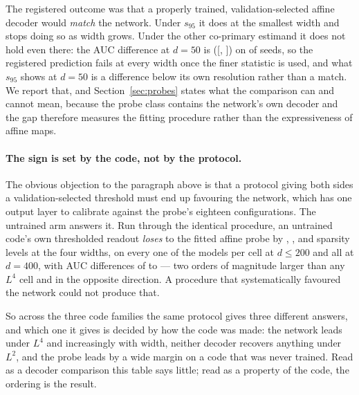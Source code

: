 The registered outcome was that a properly trained, validation-selected affine decoder would
\emph{match} the network. Under $s_{95}$ it does at the smallest width and stops doing so as width
grows. Under the other co-primary estimand it does not hold even there: the AUC difference at $d=50$
is \AucFiftyDiff{} ([\AucFiftyCiLow, \AucFiftyCiHigh]) on \AucFiftyNetWins{} of \EsevenSeeds{} seeds,
so the registered prediction fails at every width once the finer statistic is used, and what $s_{95}$
shows at $d=50$ is a difference below its own resolution rather than a match. We
report that, and Section~\ref{sec:probes} states what the comparison can and cannot mean, because
the probe class contains the network's own decoder and the gap therefore measures the fitting
procedure rather than the expressiveness of affine maps.

\paragraph{The sign is set by the code, not by the protocol.} The obvious objection to the paragraph
above is that a protocol giving both sides a validation-selected threshold must end up favouring the
network, which has one output layer to calibrate against the probe's eighteen configurations. The
untrained arm answers it. Run through the identical procedure, an untrained code's own thresholded
readout \emph{loses} to the fitted affine probe by \PrimRandFiftyDiff{}, \PrimRandHundredDiff{},
\PrimRandTwoHundredDiff{} and \PrimRandFourHundredDiff{} sparsity levels at the four widths, on every
one of the \PrimRandTwoHundredProbeWins{} models per cell at $d\le200$ and all
\PrimRandFourHundredProbeWins{} at $d=400$, with AUC differences of \PrimRandFiftyAucDiff{} to
\PrimRandFourHundredAucDiff{} --- two orders of magnitude larger than any $L^4$ cell and in the
opposite direction. A procedure that systematically favoured the network could not produce that.

So across the three code families the same protocol gives three different answers, and which one it
gives is decided by how the code was made: the network leads under $L^4$ and increasingly with width,
neither decoder recovers anything under $L^2$, and the probe leads by a wide margin on a code that
was never trained. Read as a decoder comparison this table says little; read as a property of the
code, the ordering is the result.

